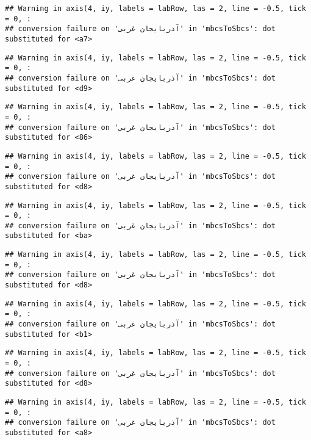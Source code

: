 \documentclass[
]{article}
\begin{document}
\begin{verbatim}
## Warning in axis(4, iy, labels = labRow, las = 2, line = -0.5, tick = 0, :
## conversion failure on 'آذربايجان غربی' in 'mbcsToSbcs': dot substituted for <a7>
\end{verbatim}

\begin{verbatim}
## Warning in axis(4, iy, labels = labRow, las = 2, line = -0.5, tick = 0, :
## conversion failure on 'آذربايجان غربی' in 'mbcsToSbcs': dot substituted for <d9>
\end{verbatim}

\begin{verbatim}
## Warning in axis(4, iy, labels = labRow, las = 2, line = -0.5, tick = 0, :
## conversion failure on 'آذربايجان غربی' in 'mbcsToSbcs': dot substituted for <86>
\end{verbatim}

\begin{verbatim}
## Warning in axis(4, iy, labels = labRow, las = 2, line = -0.5, tick = 0, :
## conversion failure on 'آذربايجان غربی' in 'mbcsToSbcs': dot substituted for <d8>
\end{verbatim}

\begin{verbatim}
## Warning in axis(4, iy, labels = labRow, las = 2, line = -0.5, tick = 0, :
## conversion failure on 'آذربايجان غربی' in 'mbcsToSbcs': dot substituted for <ba>
\end{verbatim}

\begin{verbatim}
## Warning in axis(4, iy, labels = labRow, las = 2, line = -0.5, tick = 0, :
## conversion failure on 'آذربايجان غربی' in 'mbcsToSbcs': dot substituted for <d8>
\end{verbatim}

\begin{verbatim}
## Warning in axis(4, iy, labels = labRow, las = 2, line = -0.5, tick = 0, :
## conversion failure on 'آذربايجان غربی' in 'mbcsToSbcs': dot substituted for <b1>
\end{verbatim}

\begin{verbatim}
## Warning in axis(4, iy, labels = labRow, las = 2, line = -0.5, tick = 0, :
## conversion failure on 'آذربايجان غربی' in 'mbcsToSbcs': dot substituted for <d8>
\end{verbatim}

\begin{verbatim}
## Warning in axis(4, iy, labels = labRow, las = 2, line = -0.5, tick = 0, :
## conversion failure on 'آذربايجان غربی' in 'mbcsToSbcs': dot substituted for <a8>
\end{verbatim}
\end{document}
